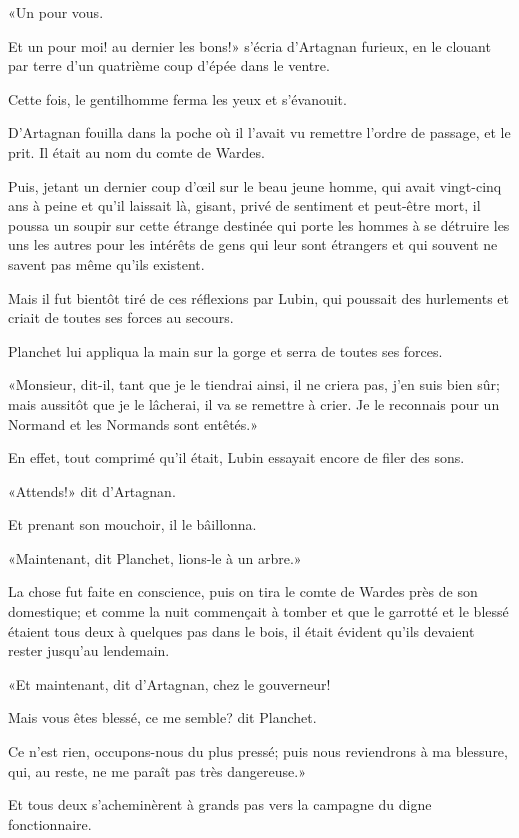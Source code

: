 «Un pour vous. 

\speak  Et un pour moi! au dernier les bons!» s'écria d'Artagnan furieux, en le clouant par terre d'un quatrième coup d'épée dans le ventre. 

Cette fois, le gentilhomme ferma les yeux et s'évanouit. 

D'Artagnan fouilla dans la poche où il l'avait vu remettre l'ordre de passage, et le prit. Il était au nom du comte de Wardes. 

Puis, jetant un dernier coup d'œil sur le beau jeune homme, qui avait vingt-cinq ans à peine et qu'il laissait là, gisant, privé de sentiment et peut-être mort, il poussa un soupir sur cette étrange destinée qui porte les hommes à se détruire les uns les autres pour les intérêts de gens qui leur sont étrangers et qui souvent ne savent pas même qu'ils existent. 

Mais il fut bientôt tiré de ces réflexions par Lubin, qui poussait des hurlements et criait de toutes ses forces au secours. 

Planchet lui appliqua la main sur la gorge et serra de toutes ses forces. 

«Monsieur, dit-il, tant que je le tiendrai ainsi, il ne criera pas, j'en suis bien sûr; mais aussitôt que je le lâcherai, il va se remettre à crier. Je le reconnais pour un Normand et les Normands sont entêtés.» 

En effet, tout comprimé qu'il était, Lubin essayait encore de filer des sons. 

«Attends!» dit d'Artagnan. 

Et prenant son mouchoir, il le bâillonna. 

«Maintenant, dit Planchet, lions-le à un arbre.» 

La chose fut faite en conscience, puis on tira le comte de Wardes près de son domestique; et comme la nuit commençait à tomber et que le garrotté et le blessé étaient tous deux à quelques pas dans le bois, il était évident qu'ils devaient rester jusqu'au lendemain. 

«Et maintenant, dit d'Artagnan, chez le gouverneur! 

\speak  Mais vous êtes blessé, ce me semble? dit Planchet. 

\speak  Ce n'est rien, occupons-nous du plus pressé; puis nous reviendrons à ma blessure, qui, au reste, ne me paraît pas très dangereuse.» 

Et tous deux s'acheminèrent à grands pas vers la campagne du digne fonctionnaire. 


